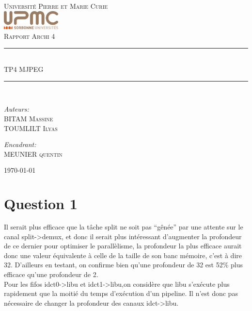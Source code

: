 \documentclass[12pt]{article}
\newcommand{\HRule}{\rule{\linewidth}{0.5mm}}
\begin{document}
\begin{titlepage}
  \begin{center}
    \textsc{\LARGE Université Pierre et Marie Curie}\\[1.5cm]
    \includegraphics[height=1cm]{upmc.png}\\[1.5cm]
    \textsc{\Large Rapport Archi 4 }\\[2cm]
    \HRule \\[1cm]
    \textsc{\huge TP4 MJPEG }\\[0.5cm]
    \HRule \\[1cm]
    \noindent
    \begin{minipage}[t]{0.55\textwidth}
      \begin{flushleft} \large
        \emph{Auteurs:}\\
        BITAM \textsc{Massine}\\
        TOUMLILT \textsc{Ilyas}
      \end{flushleft}
    \end{minipage}%
    \begin{minipage}[t]{0.47\textwidth}
      \begin{flushright} \large
        \emph{Encadrant:} \\
        MEUNIER \textsc{quentin}
      \end{flushright}
    \end{minipage}
    \vfill
    {\large \today}
  \end{center}
\end{titlepage}
\section*{Question 1}
Il serait plus efficace que la tâche split ne soit pas ``gênée'' par une attente sur le canal split->demux, et donc il serait plus intéressant d'augmenter la profondeur de ce dernier pour optimiser le parallèlisme, la profondeur la plus efficace aurait donc une valeur équivalente à celle de la taille de son banc mémoire, c'est à dire 32. D'ailleurs en testant, on confirme bien qu'une profondeur de 32 est 52\% plus efficace qu'une profondeur de 2.\\
Pour les fifos idct0->libu et idct1->libu,on considère que libu s'exécute plus rapidement que la moitié du temps d'exécution d'un pipeline. Il n'est donc pas nécessaire de changer la profondeur des canaux idct->libu.
\end{document}
